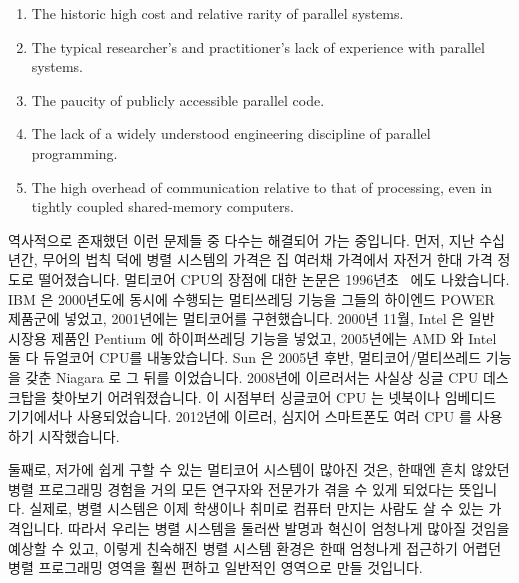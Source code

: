 \begin{enumerate}
\item	The historic high cost and relative rarity of parallel systems.
\item	The typical researcher's and practitioner's lack of experience
	with parallel systems.
\item	The paucity of publicly accessible parallel code.
\item	The lack of a widely understood engineering discipline of
	parallel programming.
\item	The high overhead of communication relative to that of processing,
	even in tightly coupled shared-memory computers.
\end{enumerate}
\fi

역사적으로 존재했던 이런 문제들 중 다수는 해결되어 가는 중입니다.
먼저, 지난 수십년간, 무어의 법칙 덕에 병렬 시스템의 가격은 집 여러채 가격에서
자전거 한대 가격 정도로 떨어졌습니다.
멀티코어 CPU의 장점에 대한 논문은 1996년초~\cite{Olukotun96} 에도 나왔습니다.
IBM 은 2000년도에 동시에 수행되는 멀티쓰레딩 기능을 그들의 하이엔드 POWER
제품군에 넣었고, 2001년에는 멀티코어를 구현했습니다.
2000년 11월, Intel 은 일반 시장용 제품인 Pentium 에 하이퍼쓰레딩 기능을 넣었고,
2005년에는 AMD 와 Intel 둘 다 듀얼코어 CPU를 내놓았습니다.
Sun 은 2005년 후반, 멀티코어/멀티쓰레드 기능을 갖춘 Niagara 로 그 뒤를
이었습니다.
2008년에 이르러서는 사실상 싱글 CPU 데스크탑을 찾아보기 어려워졌습니다.
이 시점부터 싱글코어 CPU 는 넷북이나 임베디드 기기에서나 사용되었습니다.
2012년에 이르러, 심지어 스마트폰도 여러 CPU 를 사용하기 시작했습니다.

둘째로, 저가에 쉽게 구할 수 있는 멀티코어 시스템이 많아진 것은, 한때엔 흔치
않았던 병렬 프로그래밍 경험을 거의 모든 연구자와 전문가가 겪을 수 있게 되었다는
뜻입니다.
실제로, 병렬 시스템은 이제 학생이나 취미로 컴퓨터 만지는 사람도 살
수 있는 가격입니다.
따라서 우리는 병렬 시스템을 둘러싼 발명과 혁신이 엄청나게 많아질 것임을 예상할
수 있고, 이렇게 친숙해진 병렬 시스템 환경은 한때 엄청나게 접근하기 어렵던 병렬
프로그래밍 영역을 훨씬 편하고 일반적인 영역으로 만들 것입니다.
\iffalse

